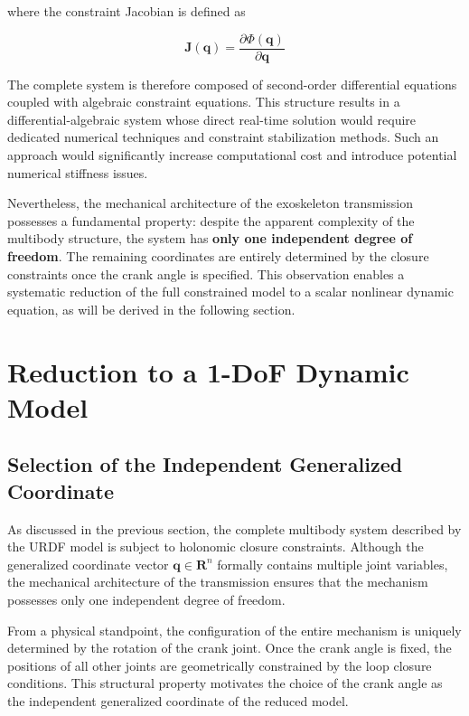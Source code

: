 where the constraint Jacobian is defined as

\begin{equation}
\textbf{J}(\textbf{q}) = \frac{\partial \Phi(\textbf{q})}{\partial \textbf{q}}
\end{equation}

The complete system is therefore composed of second-order differential equations coupled with algebraic constraint equations. This structure results in a differential-algebraic system whose direct real-time solution would require dedicated numerical techniques and constraint stabilization methods. Such an approach would significantly increase computational cost and introduce potential numerical stiffness issues.

Nevertheless, the mechanical architecture of the exoskeleton transmission possesses a fundamental property: despite the apparent complexity of the multibody structure, the system has \textbf{only one independent degree of freedom}. The remaining coordinates are entirely determined by the closure constraints once the crank angle is specified. This observation enables a systematic reduction of the full constrained model to a scalar nonlinear dynamic equation, as will be derived in the following section.

\section{Reduction to a 1-DoF Dynamic Model}
\subsection{Selection of the Independent Generalized Coordinate}
As discussed in the previous section, the complete multibody system described by the URDF model is subject to holonomic closure constraints. Although the generalized coordinate vector $\textbf{q} \in \textbf{R}^n$ formally contains multiple joint variables, the mechanical architecture of the transmission ensures that the mechanism possesses only one independent degree of freedom.

From a physical standpoint, the configuration of the entire mechanism is uniquely determined by the rotation of the crank joint. Once the crank angle is fixed, the positions of all other joints are geometrically constrained by the loop closure conditions. This structural property motivates the choice of the crank angle as the independent generalized coordinate of the reduced model.


